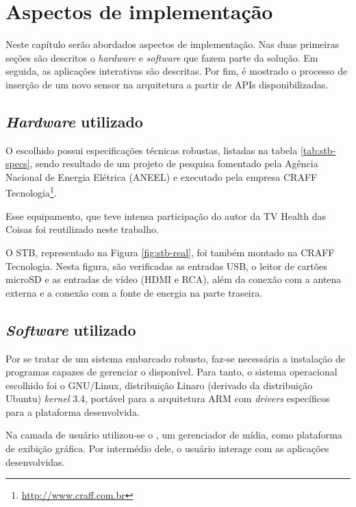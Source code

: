 \chapter{Aspectos de implementação} \label{cap:aspectos-de-implementacao}

Neste capítulo serão abordados aspectos de implementação. Nas duas primeiras
seções são descritos o \textit{hardware} e \textit{software} que fazem parte da
solução. Em seguida, as aplicações interativas são descritas. Por fim, é mostrado
o processo de inserção de um novo sensor na arquitetura a partir de APIs 
disponibilizadas.

\section{\textit{Hardware} utilizado} 

O \stb[] escolhido possui especificações técnicas robustas, listadas na 
tabela \ref{tab:stb-specs}, sendo resultado de um projeto de pesquisa
fomentado pela Agência Nacional de Energia Elétrica (ANEEL) e executado pela
empresa CRAFF Tecnologia\footnote{\url{http://www.craff.com.br}}. 

Esse equipamento, que teve intensa participação do autor da TV Health das
Coisas foi reutilizado neste trabalho.


O STB, representado na Figura \vref{fig:stb-real}, foi também montado na CRAFF
Tecnologia. Nesta figura, são verificadas as entradas USB, o leitor de cartões
microSD e as entradas de vídeo (HDMI e RCA), além da conexão com a antena
externa e a conexão com a fonte de energia na parte traseira.

\section{\textit{Software} utilizado}

Por se tratar de um sistema embarcado robusto, faz-se necessária a instalação
de programas capazes de gerenciar o \hardware[] disponível. Para tanto, o
sistema operacional escolhido foi o GNU/Linux, distribuição Linaro (derivado da
distribuição Ubuntu) \textit{kernel} 3.4, portável para a arquitetura ARM com
\textit{drivers} específicos para a plataforma desenvolvida.


Na camada de usuário utilizou-se o \software[] \xbmc[], um gerenciador de mídia,
como plataforma de exibição gráfica. Por intermédio dele, o usuário
interage com as aplicações desenvolvidas.  

